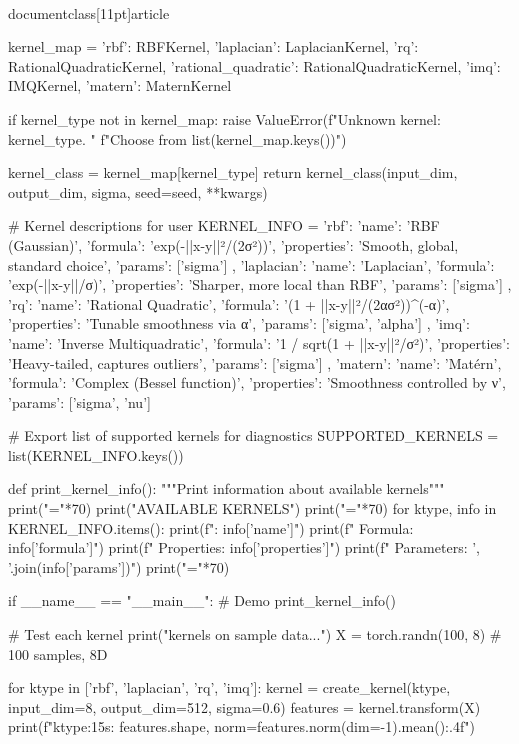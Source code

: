 \\documentclass[11pt]{article}
\begin{document}
\begin{CodeBlock}
    
    kernel_map = {
        'rbf': RBFKernel,
        'laplacian': LaplacianKernel,
        'rq': RationalQuadraticKernel,
        'rational_quadratic': RationalQuadraticKernel,
        'imq': IMQKernel,
        'matern': MaternKernel
    }
    
    if kernel_type not in kernel_map:
        raise ValueError(f"Unknown kernel: {kernel_type}. "
                        f"Choose from {list(kernel_map.keys())}")
    
    kernel_class = kernel_map[kernel_type]
    return kernel_class(input_dim, output_dim, sigma, seed=seed, **kwargs)


# Kernel descriptions for user
KERNEL_INFO = {
    'rbf': {
        'name': 'RBF (Gaussian)',
        'formula': 'exp(-||x-y||²/(2σ²))',
        'properties': 'Smooth, global, standard choice',
        'params': ['sigma']
    },
    'laplacian': {
        'name': 'Laplacian',
        'formula': 'exp(-||x-y||/σ)',
        'properties': 'Sharper, more local than RBF',
        'params': ['sigma']
    },
    'rq': {
        'name': 'Rational Quadratic',
        'formula': '(1 + ||x-y||²/(2ασ²))^(-α)',
        'properties': 'Tunable smoothness via α',
        'params': ['sigma', 'alpha']
    },
    'imq': {
        'name': 'Inverse Multiquadratic',
        'formula': '1 / sqrt(1 + ||x-y||²/σ²)',
        'properties': 'Heavy-tailed, captures outliers',
        'params': ['sigma']
    },
    'matern': {
        'name': 'Matérn',
        'formula': 'Complex (Bessel function)',
        'properties': 'Smoothness controlled by ν',
        'params': ['sigma', 'nu']
    }
}

# Export list of supported kernels for diagnostics
SUPPORTED_KERNELS = list(KERNEL_INFO.keys())


def print_kernel_info():
    """Print information about available kernels"""
    print("="*70)
    print("AVAILABLE KERNELS")
    print("="*70)
    for ktype, info in KERNEL_INFO.items():
        print(f": {info['name']}")
        print(f"  Formula: {info['formula']}")
        print(f"  Properties: {info['properties']}")
        print(f"  Parameters: {', '.join(info['params'])}")
    print("="*70)


if __name__ == "__main__":
    # Demo
    print_kernel_info()
    
    # Test each kernel
    print("\nTesting kernels on sample data...")
    X = torch.randn(100, 8)  # 100 samples, 8D
    
    for ktype in ['rbf', 'laplacian', 'rq', 'imq']:
        kernel = create_kernel(ktype, input_dim=8, output_dim=512, sigma=0.6)
        features = kernel.transform(X)
        print(f"{ktype:15s}: {features.shape}, norm={features.norm(dim=-1).mean():.4f}")
        

\end{CodeBlock}
\end{document}
